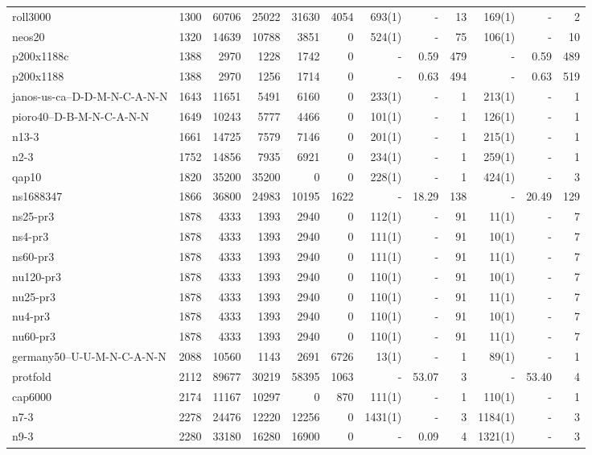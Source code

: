 \begin{sidewaystable}[Hp]
\begin{center}
\begin{tabular}{lrrrrr|rrr|rrr}
roll3000	&	1300	&	60706	&	25022	&	31630	&	4054	&	693(1)	&	-	&	13	&	169(1)	&	-	&	2	\\
neos20	&	1320	&	14639	&	10788	&	3851	&	0	&	524(1)	&	-	&	75	&	106(1)	&	-	&	10	\\
p200x1188c	&	1388	&	2970	&	1228	&	1742	&	0	&	-	&	0.59	&	479	&	-	&	0.59	&	489	\\
p200x1188	&	1388	&	2970	&	1256	&	1714	&	0	&	-	&	0.63	&	494	&	-	&	0.63	&	519	\\
janos-us-ca--D-D-M-N-C-A-N-N	&	1643	&	11651	&	5491	&	6160	&	0	&	233(1)	&	-	&	1	&	213(1)	&	-	&	1	\\
pioro40--D-B-M-N-C-A-N-N	&	1649	&	10243	&	5777	&	4466	&	0	&	101(1)	&	-	&	1	&	126(1)	&	-	&	1	\\
n13-3	&	1661	&	14725	&	7579	&	7146	&	0	&	201(1)	&	-	&	1	&	215(1)	&	-	&	1	\\
n2-3	&	1752	&	14856	&	7935	&	6921	&	0	&	234(1)	&	-	&	1	&	259(1)	&	-	&	1	\\
qap10	&	1820	&	35200	&	35200	&	0	&	0	&	228(1)	&	-	&	1	&	424(1)	&	-	&	3	\\
ns1688347	&	1866	&	36800	&	24983	&	10195	&	1622	&	-	&	18.29	&	138	&	-	&	20.49	&	129	\\
ns25-pr3	&	1878	&	4333	&	1393	&	2940	&	0	&	112(1)	&	-	&	91	&	11(1)	&	-	&	7	\\
ns4-pr3	&	1878	&	4333	&	1393	&	2940	&	0	&	111(1)	&	-	&	91	&	10(1)	&	-	&	7	\\
ns60-pr3	&	1878	&	4333	&	1393	&	2940	&	0	&	111(1)	&	-	&	91	&	11(1)	&	-	&	7	\\
nu120-pr3	&	1878	&	4333	&	1393	&	2940	&	0	&	110(1)	&	-	&	91	&	10(1)	&	-	&	7	\\
nu25-pr3	&	1878	&	4333	&	1393	&	2940	&	0	&	110(1)	&	-	&	91	&	11(1)	&	-	&	7	\\
nu4-pr3	&	1878	&	4333	&	1393	&	2940	&	0	&	110(1)	&	-	&	91	&	10(1)	&	-	&	7	\\
nu60-pr3	&	1878	&	4333	&	1393	&	2940	&	0	&	110(1)	&	-	&	91	&	11(1)	&	-	&	7	\\
germany50--U-U-M-N-C-A-N-N	&	2088	&	10560	&	1143	&	2691	&	6726	&	13(1)	&	-	&	1	&	89(1)	&	-	&	1	\\
protfold	&	2112	&	89677	&	30219	&	58395	&	1063	&	-	&	53.07	&	3	&	-	&	53.40	&	4	\\
cap6000	&	2174	&	11167	&	10297	&	0	&	870	&	111(1)	&	-	&	1	&	110(1)	&	-	&	1	\\
n7-3	&	2278	&	24476	&	12220	&	12256	&	0	&	1431(1)	&	-	&	3	&	1184(1)	&	-	&	3	\\
n9-3	&	2280	&	33180	&	16280	&	16900	&	0	&	-	&	0.09	&	4	&	1321(1)	&	-	&	3	\\

\end{tabular}
\end{center}
\end{sidewaystable}
